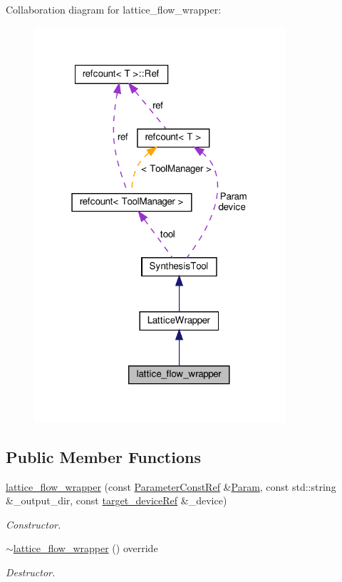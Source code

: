 Collaboration diagram for lattice\+\_\+flow\+\_\+wrapper\+:
\nopagebreak
\begin{figure}[H]
\begin{center}
\leavevmode
\includegraphics[width=265pt]{d7/dbb/classlattice__flow__wrapper__coll__graph}
\end{center}
\end{figure}
\subsection*{Public Member Functions}
\begin{DoxyCompactItemize}
\item 
\hyperlink{classlattice__flow__wrapper_a76ce7f3d8b84cbbf9cd7f092092276e6}{lattice\+\_\+flow\+\_\+wrapper} (const \hyperlink{Parameter_8hpp_a37841774a6fcb479b597fdf8955eb4ea}{Parameter\+Const\+Ref} \&\hyperlink{classSynthesisTool_a854ef102782ff4d069e1aa6d1a94d64e}{Param}, const std\+::string \&\+\_\+output\+\_\+dir, const \hyperlink{target__device_8hpp_acedb2b7a617e27e6354a8049fee44eda}{target\+\_\+device\+Ref} \&\+\_\+device)
\begin{DoxyCompactList}\small\item\em Constructor. \end{DoxyCompactList}\item 
\hyperlink{classlattice__flow__wrapper_a00583cc0d25a13ef910ab0dd87f62feb}{$\sim$lattice\+\_\+flow\+\_\+wrapper} () override
\begin{DoxyCompactList}\small\item\em Destructor. \end{DoxyCompactList}\end{DoxyCompactItemize}
